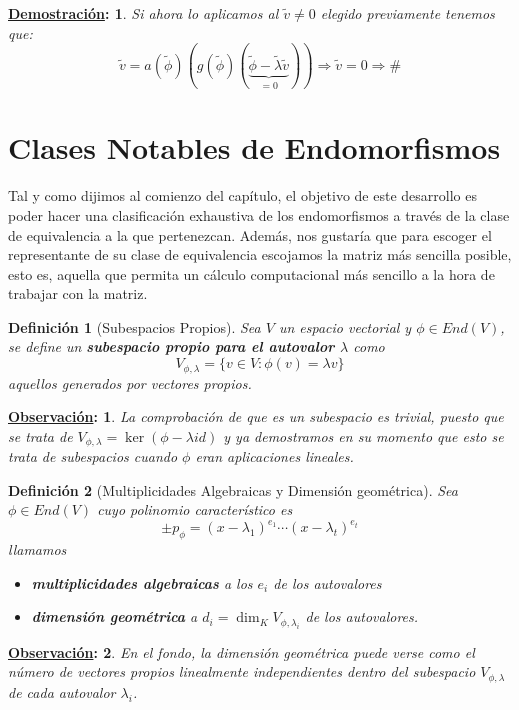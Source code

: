\documentclass[10pt,a4paper,openright]{book}
\theoremstyle{break}
\newtheorem*{defi}{Definición}
\newtheorem*{demo}{\underline{Demostración}:}
\newtheorem*{obs}{\underline{Observación}:}
\begin{document}
\begin{demo}
Si ahora lo aplicamos al $\tilde{v}\neq 0$ elegido previamente tenemos que:
$$\tilde{v}=a(\tilde{\phi})\left(g(\tilde{\phi})\left(\underbrace{\tilde{\phi}-\tilde{\lambda}\tilde{v}}_{=0}\right)\right)\Rightarrow \tilde{v}=0\Rightarrow\#$$
\end{demo}


\section{Clases Notables de Endomorfismos}
Tal y como dijimos al comienzo del capítulo, el objetivo de este desarrollo es poder hacer una clasificación exhaustiva de los endomorfismos a través de la clase de equivalencia a la que pertenezcan. Además, nos gustaría que para escoger el representante de su clase de equivalencia escojamos la matriz más sencilla posible, esto es, aquella que permita un cálculo computacional más sencillo a la hora de trabajar con la matriz.


\begin{defi}[Subespacios Propios]
Sea $V$ un espacio vectorial y $\phi  \in End(V)$, se define un \textbf{subespacio propio para el autovalor $\lambda$} como
$$
V_{\phi, \lambda}=\{v\in V : \phi(v) = \lambda v\}
$$
aquellos generados por vectores propios.
\end{defi}

\begin{obs}
La comprobación de que es un subespacio es trivial, puesto que se trata de $V_{\phi,\lambda} = \ker(\phi-\lambda id)$ y ya demostramos en su momento que esto se trata de subespacios cuando $\phi$ eran aplicaciones lineales.
\end{obs}

\begin{defi}[Multiplicidades Algebraicas y Dimensión geométrica]
Sea $\phi \in End(V)$ cuyo polinomio característico es
$$
\pm p_\phi=(x-\lambda_1)^{e_1}\cdots (x-\lambda_t)^{e_t}
$$
llamamos
\begin{itemize}
\item \textbf{multiplicidades algebraicas} a los $e_i$ de los autovalores
\item \textbf{dimensión geométrica} a $d_i = \dim_K V_{\phi,\lambda_i}$ de los autovalores.
\end{itemize}
\end{defi}

\begin{obs}
En el fondo, la dimensión geométrica puede verse como el número de vectores propios linealmente independientes dentro del subespacio $V_{\phi, \lambda}$ de cada autovalor $\lambda_i$.
\end{obs}
\end{document}
